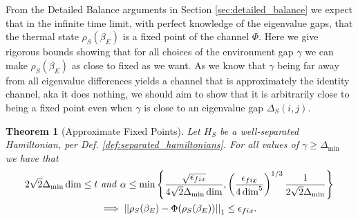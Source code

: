 \documentclass{article}
\newtheorem{theorem}{Theorem}
\newcommand{\parens}[1]{\left( #1 \right)}
\newcommand{\norm}[1]{\left| \left| #1 \right| \right|}
\newcommand{\set}[1]{\left\{ #1 \right\}}
\begin{document}
From the Detailed Balance arguments in Section \ref{sec:detailed_balance} we expect that in the infinite time limit, with perfect knowledge of the eigenvalue gaps, that the thermal state $\rho_S(\beta_E)$ is a fixed point of the channel $\Phi$. Here we give rigorous bounds showing that for all choices of the environment gap $\gamma$ we can make $\rho_S(\beta_E)$ as close to fixed as we want. As we know that $\gamma$ being far away from all eigenvalue differences yields a channel that is approximately the identity channel, aka it does nothing, we should aim to show that it is arbitrarily close to being a fixed point even when $\gamma$ is close to an eigenvalue gap $\Delta_S(i,j)$. 
\begin{theorem}[Approximate Fixed Points]
    Let $H_S$ be a well-separated Hamiltonian, per Def. \ref{def:separated_hamiltonians}. For all values of $\gamma \geq \Delta_{\min}$ we have that 
    \begin{align}
        2 \sqrt{2} \Delta_{\min} \dim \leq t& \text{ \emph{and} } \alpha \leq \min \set{\frac{\sqrt{\epsilon_{fix}}}{4 \sqrt{2} \Delta_{\min} \dim}, \parens{\frac{\epsilon_{fix}}{4 \dim^5}}^{1/3} \frac{1}{2 \sqrt{2} \Delta_{\min} }} \nonumber \\
        &\implies \norm{\rho_S(\beta_E) - \Phi(\rho_S(\beta_E))}_1 \leq \epsilon_{fix}. \label{eq:beta_e_fixed_point_reqs}
    \end{align}
\end{theorem}
\end{document}
